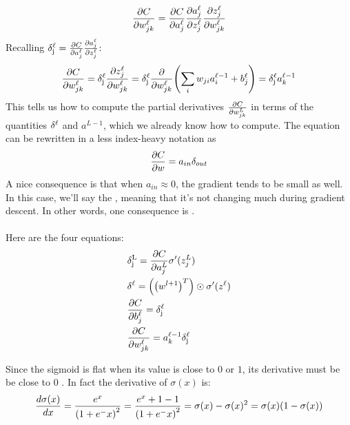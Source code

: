 \paragraph{}
\begin{equation}
\frac{\mathrm{\partial} C}{\mathrm{\partial} w_{jk}^\ell} = \frac{\mathrm{\partial} C}{\mathrm{\partial} a_j^\ell} \frac{\mathrm{\partial} a_j^\ell}{\mathrm{\partial} z_j^\ell} \frac{\mathrm{\partial} z_j^\ell}{\mathrm{\partial} w_{jk}^\ell} 
\end{equation}
Recalling $\mathrm{\delta^\ell_j}= \frac{\mathrm{\partial} C}{\mathrm{\partial} a_j^\ell} \frac{\mathrm{\partial} a_j^\ell}{\mathrm{\partial} z_j^\ell}$:
\begin{equation}
\frac{\pr C}{\pr w_{jk}^\ell} = \derlj \frac{\pr z_j^\ell}{\pr w_{jk}^\ell} =  \derlj \frac{\pr }{\pr w_{jk}^\ell} \br{\sum_i w_{ji}a_i^{\ell-1}+b_j^\ell} =  \derlj a_k^{\ell-1}
\end{equation}
This tells us how to compute the partial derivatives $\frac{\mathrm{\partial} C}{\mathrm{\partial} w_{jk}^L} $ in terms of the quantities $\mathrm{\delta^\ell}$ and $a^{L-1}$, which we already know how to compute. The equation can be rewritten in a less index-heavy notation as
\begin{equation}
\frac{\mathrm{\partial} C}{\mathrm{\partial} w}  = a_{in} \delta_{out}
\end{equation}
A nice consequence is that when $a_{in} \approx 0$, the gradient tends to be small as well. In this case, we'll say the , meaning that it's not changing much during gradient descent. In other words, one consequence is .

\paragraph{}Here are the four equations:
\begin{equation}
\begin{aligned}
&\mathrm{\delta^L_j} = \frac{\mathrm{\partial} C}{\mathrm{\partial} a_j^L} \sigma'(z_j^L)\\
&\mathrm{\delta^\ell} = \left(\left(w^{l+1}\right)^T\right)\odot \sigma'(z^\ell)\\
&\frac{\mathrm{\partial} C}{\mathrm{\partial} b_{j}^\ell}  = \mathrm{\delta^\ell_j}\\
&\frac{\mathrm{\partial} C}{\mathrm{\partial} w_{jk}^\ell}= a_k^{\ell-1}\mathrm{\delta^\ell_j}\\
\end{aligned}
\end{equation}

Since the sigmoid is flat when its value is close to $0$ or $1$, its derivative must be be close to $0$ . In fact the derivative of $\sigma(x)$ is:
\begin{equation}
\frac{d \sigma(x)}{d x} = \frac{e^x}{\br{1+e^-x}^2} = \frac{e^x+1-1}{\br{1+e^-x}^2} =\sigma(x) - \sigma(x)^2 = \sigma(x) \br{1-\sigma(x)}
\end{equation}

